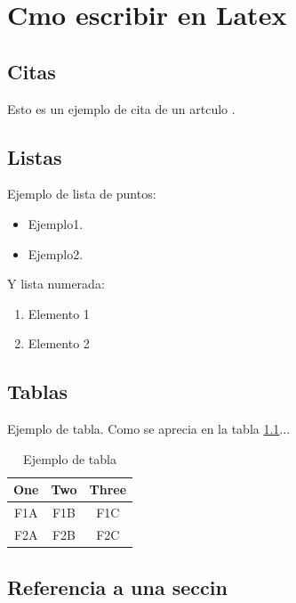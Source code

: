 \chapter{Cmo escribir en Latex}

\section{Citas}


Esto es un ejemplo de cita de un artculo \cite{Brunete:2013}.


\section{Listas}

Ejemplo de lista de puntos:
\begin{itemize}
\item Ejemplo1.
\item Ejemplo2.
\end{itemize}

Y lista numerada:
\begin{enumerate}
\item Elemento 1
\item Elemento 2
\end{enumerate}

\section{Tablas}

Ejemplo de tabla. Como se aprecia en la tabla \ref{tab:table_example}...
\begin{table}[tb]
\caption{Ejemplo de tabla}
\label{tab:table_example}
\begin{center}
\begin{tabular}{|c||c|c|}
\hline
One & Two & Three\\
\hline
F1A & F1B & F1C\\
F2A & F2B & F2C\\
\hline
\end{tabular}
\end{center}
\end{table}

\section{Referencia a una seccin}
\label{sec:refsec}

